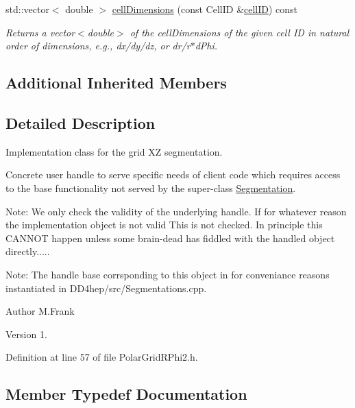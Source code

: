 \begin{DoxyCompactItemize}
std\+::vector$<$ double $>$ \hyperlink{class_d_d4hep_1_1_geometry_1_1_polar_grid_r_phi2_abd30908ecca9abb35fc99692af3e8006}{cell\+Dimensions} (const Cell\+ID \&\hyperlink{class_d_d4hep_1_1_geometry_1_1_polar_grid_r_phi2_ad259f199ef0f54e752c28b436a7ee510}{cell\+ID}) const
\begin{DoxyCompactList}\small\item\em Returns a vector$<$double$>$ of the cell\+Dimensions of the given cell ID in natural order of dimensions, e.\+g., dx/dy/dz, or dr/r$\ast$d\+Phi. \end{DoxyCompactList}\end{DoxyCompactItemize}
\subsection*{Additional Inherited Members}


\subsection{Detailed Description}
Implementation class for the grid XZ segmentation. 

Concrete user handle to serve specific needs of client code which requires access to the base functionality not served by the super-\/class \hyperlink{class_d_d4hep_1_1_geometry_1_1_segmentation}{Segmentation}.

Note\+: We only check the validity of the underlying handle. If for whatever reason the implementation object is not valid This is not checked. In principle this C\+A\+N\+N\+OT happen unless some brain-\/dead has fiddled with the handled object directly.....

Note\+: The handle base corrsponding to this object in for conveniance reasons instantiated in D\+D4hep/src/\+Segmentations.\+cpp.

\begin{DoxyAuthor}{Author}
M.\+Frank 
\end{DoxyAuthor}
\begin{DoxyVersion}{Version}
1. 
\end{DoxyVersion}


Definition at line 57 of file Polar\+Grid\+R\+Phi2.\+h.



\subsection{Member Typedef Documentation}
\hypertarget{class_d_d4hep_1_1_geometry_1_1_polar_grid_r_phi2_a1067131b00d726a9739132de2eea6d86}{}\label{class_d_d4hep_1_1_geometry_1_1_polar_grid_r_phi2_a1067131b00d726a9739132de2eea6d86} 
